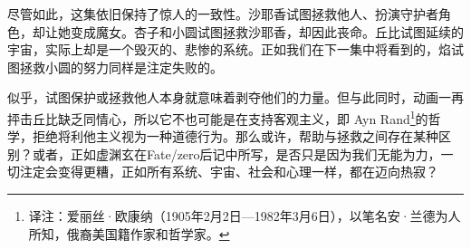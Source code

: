 尽管如此，这集依旧保持了惊人的一致性。沙耶香试图拯救他人、扮演守护者角色，却让她变成魔女。杏子和小圆试图拯救沙耶香，却因此丧命。丘比试图延续的宇宙，实际上却是一个毁灭的、悲惨的系统。正如我们在下一集中将看到的，焰试图拯救小圆的努力同样是注定失败的。

似乎，试图保护或拯救他人本身就意味着剥夺他们的力量。但与此同时，动画一再抨击丘比缺乏同情心，所以它不也可能是在支持客观主义，即 Ayn Rand\footnote{译注：爱丽丝·欧康纳（1905年2月2日—1982年3月6日），以笔名安·兰德为人所知，俄裔美国籍作家和哲学家。}的哲学，拒绝将利他主义视为一种道德行为\cite{ref61}。那么或许，帮助与拯救之间存在某种区别？或者，正如虚渊玄在Fate/zero后记中所写，是否只是因为我们无能为力，一切注定会变得更糟，正如所有系统、宇宙、社会和心理一样，都在迈向热寂\cite{ref29}？
